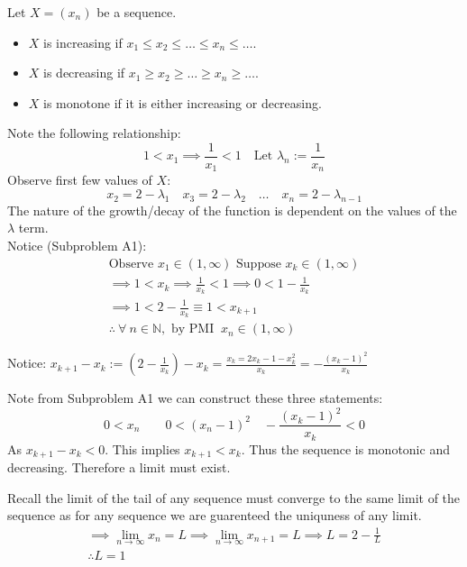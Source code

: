\documentclass[../main.tex]{subfiles}
\begin{document}

 { Let $X=(x_n)$ be a sequence. \begin{itemize} \item $X$ is increasing if $x_1 \le x_2 \le \dots \le x_n \le \dots$. \item $X$ is decreasing if $x_1 \ge x_2 \ge \dots \ge x_n \ge \dots$. \item $X$ is monotone if it is either increasing or decreasing. \end{itemize}}
Note the following relationship:
\[
	1<x_1 \implies \frac{1}{x_1} < 1 \quad \text{Let } \lambda_n:=\frac{1}{x_n}
\]
Observe first few values of $X$: \\
\[
	x_{2} = 2-\lambda_1 \quad x_3 = 2 - \lambda_2  \quad \dots \quad x_n = 2 - \lambda_{n-1}
\]
The nature of the growth/decay of the function is dependent on the values of the $\lambda$ term. \\

Notice (Subproblem A1):
\[
	\begin{gathered}
		\text{Observe }x_1 \in  (1,\infty) \text{ Suppose } x_k \in  (1,\infty) \\
		\implies 1 < x_k  \implies \frac{1}{x_k} < 1 \implies 0 < 1-\frac{1}{x_k} \\
		\implies 1 < 2-\frac{1}{x_k} \equiv  1 < x_{k+1} \\
		\therefore ~\forall~ n \in \mathbb{N}, \text{ by PMI }~x_n \in  \left(  1,\infty\right)
	\end{gathered}
\]

Notice: $x_{k+1} - x_k := \left( 2 - \frac{1}{x_k} \right) - x_k =  \frac{x_k = 2x_k -1 - x_k^2}{x_k} = -\frac{(x_k-1)^2}{x_k}$

Note from Subproblem A1 we can construct  these three statements:
\[
	0<x_n  \quad\quad 0<(x_n-1)^2  \quad -\frac{(x_k-1)^2}{x_k} < 0
\]
As $x_{k+1} - x_k < 0$. This implies $x_{k+1} < x_k$. Thus the sequence is monotonic and decreasing. Therefore a limit must exist.

Recall the limit of the tail of any sequence must converge to the same limit of the sequence as for any sequence we are guarenteed the uniquness of any limit.
\[
	\begin{gathered}
		\implies  \lim_{n \to \infty} x_n = L \implies  \lim_{n \to \infty} x_{n+1} = L \implies  L = 2 - \frac{1}{L} \\
		\therefore  L = 1
	\end{gathered}
\]
\end{document}
